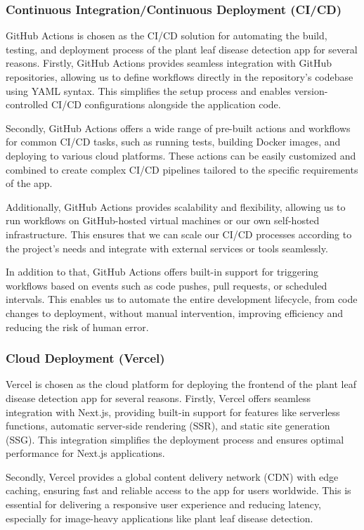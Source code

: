 \documentclass{article}
\begin{document}
\subsubsection{Continuous Integration/Continuous Deployment (CI/CD)}

GitHub Actions is chosen as the CI/CD solution for automating the build, testing, and deployment process of the plant leaf disease detection app for several reasons. Firstly, GitHub Actions provides seamless integration with GitHub repositories, allowing us to define workflows directly in the repository's codebase using YAML syntax. This simplifies the setup process and enables version-controlled CI/CD configurations alongside the application code.

Secondly, GitHub Actions offers a wide range of pre-built actions and workflows for common CI/CD tasks, such as running tests, building Docker images, and deploying to various cloud platforms. These actions can be easily customized and combined to create complex CI/CD pipelines tailored to the specific requirements of the app.

Additionally, GitHub Actions provides scalability and flexibility, allowing us to run workflows on GitHub-hosted virtual machines or our own self-hosted infrastructure. This ensures that we can scale our CI/CD processes according to the project's needs and integrate with external services or tools seamlessly.

In addition to that, GitHub Actions offers built-in support for triggering workflows based on events such as code pushes, pull requests, or scheduled intervals. This enables us to automate the entire development lifecycle, from code changes to deployment, without manual intervention, improving efficiency and reducing the risk of human error.


\subsubsection{Cloud Deployment (Vercel)}

Vercel is chosen as the cloud platform for deploying the frontend of the plant leaf disease detection app for several reasons. Firstly, Vercel offers seamless integration with Next.js, providing built-in support for features like serverless functions, automatic server-side rendering (SSR), and static site generation (SSG). This integration simplifies the deployment process and ensures optimal performance for Next.js applications.

Secondly, Vercel provides a global content delivery network (CDN) with edge caching, ensuring fast and reliable access to the app for users worldwide. This is essential for delivering a responsive user experience and reducing latency, especially for image-heavy applications like plant leaf disease detection.
\end{document}
